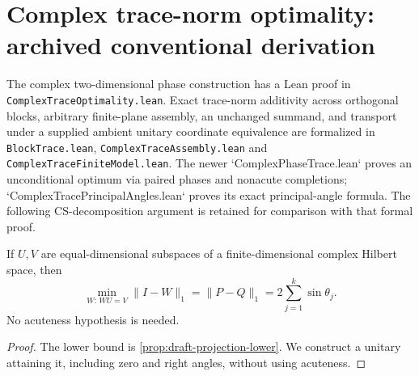 \section{Complex trace-norm optimality: archived conventional derivation}
\label{sec:unformalized-sharp-displacement}

\begin{tcolorbox}[
  enhanced, breakable, colback=white, colframe=red!80!black,
  colbacktitle=red!6!white, coltitle=red!80!black,
  title={ARCHIVED CONVENTIONAL DERIVATION --- full theorem now Lean-verified},
  fonttitle=\bfseries, boxrule=1.05pt,
  left=9pt, right=9pt, top=9pt, bottom=9pt,
  before skip=12pt, after skip=12pt]

The complex two-dimensional phase construction has a Lean proof in
\texttt{ComplexTraceOptimality.lean}. Exact trace-norm additivity across
orthogonal blocks, arbitrary finite-plane assembly, an unchanged summand,
and transport under a supplied ambient unitary coordinate equivalence
are formalized in \texttt{BlockTrace.lean},
\texttt{ComplexTraceAssembly.lean} and
\texttt{ComplexTraceFiniteModel.lean}. The newer `ComplexPhaseTrace.lean` proves an unconditional optimum via
paired phases and nonacute completions; `ComplexTracePrincipalAngles.lean`
proves its exact principal-angle formula. The following CS-decomposition
argument is retained for comparison with that formal proof.

\begin{proposition}
\label{prop:draft-complex-trace-optimum}
If $U,V$ are equal-dimensional subspaces of a finite-dimensional complex
Hilbert space, then
\begin{equation}
  \min_{W:\,WU=V}\|I-W\|_1
  =\|P-Q\|_1
  =2\sum_{j=1}^k\sin\theta_j.
  \label{eq:draft-complex-trace-optimum}
\end{equation}
No acuteness hypothesis is needed.
\end{proposition}

\begin{proof}
The lower bound is \cref{prop:draft-projection-lower}. We construct a unitary
attaining it, including zero and right angles, without using acuteness.


\end{proof}
\end{tcolorbox}
